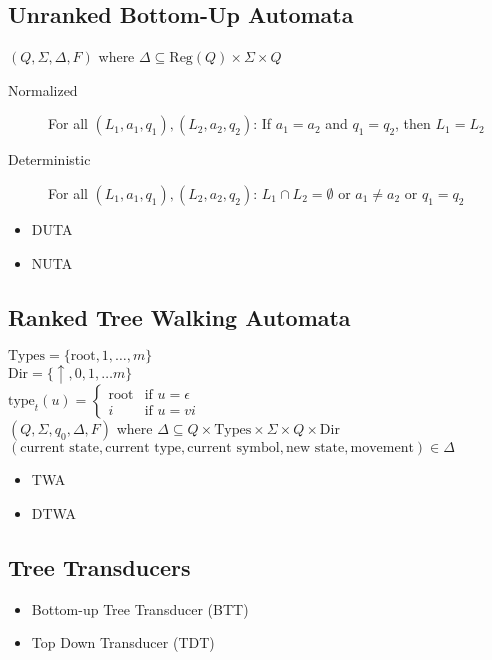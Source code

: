 \documentclass{article}
\begin{document}
\subsection{Unranked Bottom-Up Automata}
$(Q, \Sigma, \Delta, F)$ where $\Delta \subseteq \text{Reg}(Q) \times \Sigma \times Q$

\begin{description}
	\item[Normalized] For all $(L_1, a_1, q_1), (L_2, a_2, q_2)$: If $a_1 = a_2$ and $q_1 = q_2$, then $L_1 = L_2$
	\item[Deterministic] For all $(L_1, a_1, q_1), (L_2, a_2, q_2)$: $L_1 \cap L_2 = \emptyset$ or $a_1 \neq a_2$ or $q_1 = q_2$ 
\end{description}

\begin{itemize}
	\item DUTA
	\item NUTA
\end{itemize}

\subsection{Ranked Tree Walking Automata}
$\text{Types} = \{\text{root}, 1, \dots, m\}$ \\
$\text{Dir} = \{\uparrow, 0, 1, \dots m\}$ \\
$\text{type}_t(u) = \begin{cases}\text{root} & \text{if } u = \epsilon \\ i & \text{if } u = vi\end{cases}$ \vspace{10pt}
\\ 
$(Q, \Sigma, q_0, \Delta, F)$ where $\Delta \subseteq Q \times \text{Types} \times \Sigma \times Q \times \text{Dir}$ \\
$(\text{current state}, \text{current type}, \text{current symbol}, \text{new state}, \text{movement}) \in \Delta$

\begin{itemize}
	\item TWA
	\item DTWA
\end{itemize}

\subsection{Tree Transducers}
\begin{itemize}
	\item Bottom-up Tree Transducer (BTT)
	\item Top Down Transducer (TDT)
\end{itemize}
\end{document}

